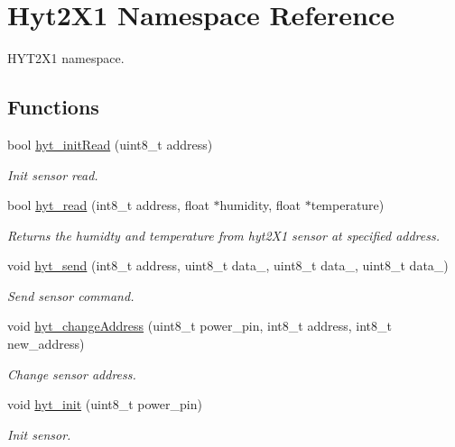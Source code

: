 \hypertarget{namespaceHyt2X1}{}\section{Hyt2\+X1 Namespace Reference}
\label{namespaceHyt2X1}


H\+Y\+T2\+X1 namespace.  


\subsection*{Functions}
\begin{DoxyCompactItemize}
\item 
bool \hyperlink{namespaceHyt2X1_a5c47620fc3a7b6573620f84f26d33ab5}{hyt\+\_\+init\+Read} (uint8\+\_\+t address)
\begin{DoxyCompactList}\small\item\em Init sensor read. \end{DoxyCompactList}\item 
bool \hyperlink{namespaceHyt2X1_a69220922c024c6ab149fee8ad4080a5d}{hyt\+\_\+read} (int8\+\_\+t address, float $\ast$humidity, float $\ast$temperature)
\begin{DoxyCompactList}\small\item\em Returns the humidty and temperature from hyt2\+X1 sensor at specified address. \end{DoxyCompactList}\item 
void \hyperlink{namespaceHyt2X1_a968bbf2c9acb17b73e0d7d5ac12bf575}{hyt\+\_\+send} (int8\+\_\+t address, uint8\+\_\+t data\+\_, uint8\+\_\+t data\+\_, uint8\+\_\+t data\+\_)
\begin{DoxyCompactList}\small\item\em Send sensor command. \end{DoxyCompactList}\item 
void \hyperlink{namespaceHyt2X1_a50b36c601c9bddb5c26ca1b0b9d36458}{hyt\+\_\+change\+Address} (uint8\+\_\+t power\+\_\+pin, int8\+\_\+t address, int8\+\_\+t new\+\_\+address)
\begin{DoxyCompactList}\small\item\em Change sensor address. \end{DoxyCompactList}\item 
void \hyperlink{namespaceHyt2X1_ae551ea888fff17a685ded74f1ef12635}{hyt\+\_\+init} (uint8\+\_\+t power\+\_\+pin)
\begin{DoxyCompactList}\small\item\em Init sensor. \end{DoxyCompactList}\item 

\end{DoxyCompactItemize}
